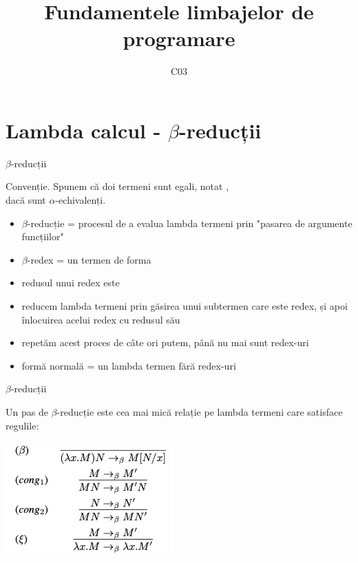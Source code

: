 \documentclass[xcolor=pdftex,romanian,colorlinks]{beamer}
\title[FLP]{Fundamentele limbajelor de programare}
\subtitle{C03}
\date{}
\begin{document}
\begin{frame}
  \titlepage
\end{frame}

\setlength{\leftmargini}{12pt}

\section{\color{section-color} Lambda calcul - $\beta$-reducții}

\begin{frame}[fragile]{$\beta$-reducții}

\alert{Convenție.} Spunem că doi termeni sunt egali, notat ,\\ dacă sunt $\alpha$-echivalenți.

\begin{itemize}
	\item \alert{$\beta$-reducție} = procesul de a evalua lambda termeni prin "pasarea de argumente funcțiilor"

	\item \alert{$\beta$-redex} = un termen de forma 

	\item \alert{redusul} unui redex  este 
	
	\item reducem lambda termeni prin găsirea unui subtermen care este redex, și apoi înlocuirea acelui redex cu redusul său
	
	\item repetăm acest proces de câte ori putem, până nu mai sunt redex-uri
	
	\item \alert{formă normală} = un lambda termen fără redex-uri
\end{itemize}
\end{frame}

\begin{frame}[fragile]{$\beta$-reducții}

Un pas de $\beta$-reducție \intens{$\rightarrow_\beta$}  este cea mai mică relație pe lambda termeni care satisface regulile:

\begin{center}
\includegraphics[scale=.6]{images/beta-reduct}
\end{center}

\end{frame}
\end{document}
